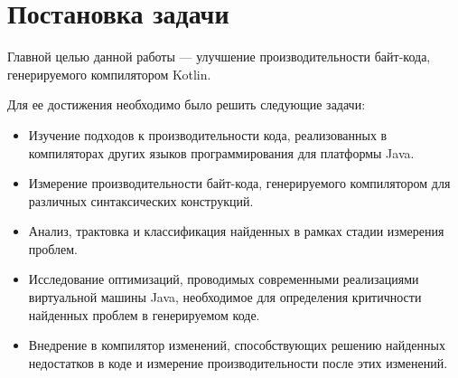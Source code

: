 



\clearpage

\section*{Постановка задачи}

Главной целью данной работы --- улучшение производительности байт-кода, генерируемого компилятором
Kotlin.

Для ее достижения необходимо было решить следующие задачи:
\begin{itemize}
    \item Изучение подходов к производительности кода, реализованных в компиляторах других
    языков программирования для платформы Java.

    \item Измерение производительности байт-кода, генерируемого компилятором для различных
    синтаксических конструкций.

    \item Анализ, трактовка и классификация найденных в рамках стадии измерения проблем.

    \item Исследование оптимизаций, проводимых современными реализациями виртуальной машины
    Java, необходимое для определения критичности найденных проблем в генерируемом коде.

    \item Внедрение в компилятор изменений, способствующих решению найденных недостатков в коде
    и измерение производительности после этих изменений.
\end{itemize}

\clearpage
